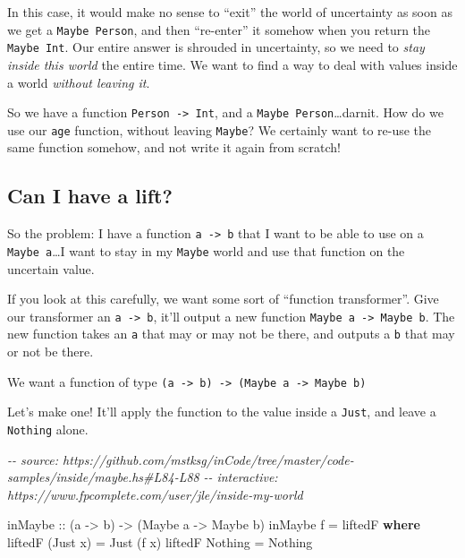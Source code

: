 \documentclass[]{article}
\newenvironment{Shaded}{}{}
\newcommand{\CommentTok}[1]{\textcolor[rgb]{0.38,0.63,0.69}{\textit{#1}}}
\newcommand{\DataTypeTok}[1]{\textcolor[rgb]{0.56,0.13,0.00}{#1}}
\newcommand{\KeywordTok}[1]{\textcolor[rgb]{0.00,0.44,0.13}{\textbf{#1}}}
\newcommand{\NormalTok}[1]{#1}
\newcommand{\OtherTok}[1]{\textcolor[rgb]{0.00,0.44,0.13}{#1}}
\begin{document}
In this case, it would make no sense to ``exit'' the world of uncertainty as
soon as we get a \texttt{Maybe\ Person}, and then ``re-enter'' it somehow when
you return the \texttt{Maybe\ Int}. Our entire answer is shrouded in
uncertainty, so we need to \emph{stay inside this world} the entire time. We
want to find a way to deal with values inside a world \emph{without leaving it}.

So we have a function \texttt{Person\ -\textgreater{}\ Int}, and a
\texttt{Maybe\ Person}\ldots darnit. How do we use our \texttt{age} function,
without leaving \texttt{Maybe}? We certainly want to re-use the same function
somehow, and not write it again from scratch!

\subsection{Can I have a lift?}\label{can-i-have-a-lift}

So the problem: I have a function \texttt{a\ -\textgreater{}\ b} that I want to
be able to use on a \texttt{Maybe\ a}\ldots I want to stay in my \texttt{Maybe}
world and use that function on the uncertain value.

If you look at this carefully, we want some sort of ``function transformer''.
Give our transformer an \texttt{a\ -\textgreater{}\ b}, it'll output a new
function \texttt{Maybe\ a\ -\textgreater{}\ Maybe\ b}. The new function takes an
\texttt{a} that may or may not be there, and outputs a \texttt{b} that may or
not be there.

We want a function of type
\texttt{(a\ -\textgreater{}\ b)\ -\textgreater{}\ (Maybe\ a\ -\textgreater{}\ Maybe\ b)}

Let's make one! It'll apply the function to the value inside a \texttt{Just},
and leave a \texttt{Nothing} alone.

\begin{Shaded}
\begin{Highlighting}[]
\CommentTok{{-}{-} source: https://github.com/mstksg/inCode/tree/master/code{-}samples/inside/maybe.hs\#L84{-}L88}
\CommentTok{{-}{-} interactive: https://www.fpcomplete.com/user/jle/inside{-}my{-}world}

\OtherTok{inMaybe ::}\NormalTok{ (a }\OtherTok{{-}\textgreater{}}\NormalTok{ b) }\OtherTok{{-}\textgreater{}}\NormalTok{ (}\DataTypeTok{Maybe}\NormalTok{ a }\OtherTok{{-}\textgreater{}} \DataTypeTok{Maybe}\NormalTok{ b)}
\NormalTok{inMaybe f }\OtherTok{=}\NormalTok{ liftedF}
  \KeywordTok{where}
\NormalTok{    liftedF (}\DataTypeTok{Just}\NormalTok{ x) }\OtherTok{=} \DataTypeTok{Just}\NormalTok{ (f x)}
\NormalTok{    liftedF }\DataTypeTok{Nothing}  \OtherTok{=} \DataTypeTok{Nothing}
\end{Highlighting}
\end{Shaded}
\end{document}
